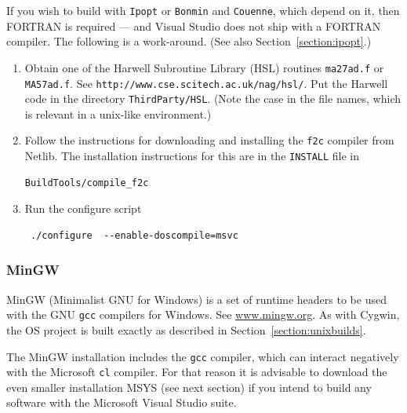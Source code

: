 \documentclass[11pt]{article}
\renewcommand{\_}{{\char"5F}}
\renewcommand{\{}{{\char"7B}}
\renewcommand{\}}{{\char"7D}}
\renewcommand{\^}{{\char"0D}}
\renewcommand{\'}{{\char"0D}}
\newcommand{\UrlHsl}{http://www.cse.scitech.ac.uk/nag/hsl/}
\begin{document}
\begin{enumerate}[Step 1:]
If you wish to build with {\tt Ipopt} or {\tt Bonmin} and {\tt Couenne}, which depend on it, 
then FORTRAN is required --- and Visual Studio does not ship with a FORTRAN compiler.
The following is a work-around. (See also Section~\ref{section:ipopt}.)

\begin{enumerate}[Step a.]

\item{}  Obtain one of the   Harwell Subroutine Library (HSL) routines
{\tt ma27ad.f} or {\tt MA57ad.f}. See {\tt\UrlHsl}.  Put the Harwell code in the
directory {\tt ThirdParty/HSL}. (Note the case in the file names, which is relevant in a unix-like environment.)




\item{}  Follow the instructions for downloading and installing the {\tt f2c} compiler from Netlib.
The installation instructions for this are in the {\tt INSTALL} file in
\begin{verbatim}
BuildTools/compile_f2c
\end{verbatim}



\item{}  Run the configure script

\begin{verbatim}
 ./configure  --enable-doscompile=msvc
\end{verbatim}


\end{enumerate}


\end{enumerate}



\subsubsection{MinGW} \label{section:mingw}


MinGW (Minimalist GNU for Windows) is a set of runtime headers to be used with the GNU {\tt gcc} compilers for Windows.
See \url{www.mingw.org}. As with Cygwin, the OS project is  built exactly as described in Section~\ref{section:unixbuilds}.

The MinGW installation includes the {\tt gcc} compiler, which can interact negatively with the Microsoft {\tt cl} compiler.
For that reason it is advisable to download the even smaller installation MSYS (see next section) if you intend to
build any software with the Microsoft Visual Studio suite.
\end{document}
